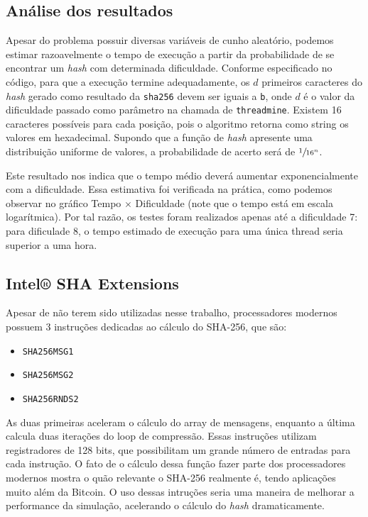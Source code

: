 \documentclass[12pt]{article}
\begin{document}
\subsection{Análise dos resultados}
Apesar do problema possuir diversas variáveis de cunho aleatório,
podemos estimar razoavelmente o tempo de execução
a partir da probabilidade de se encontrar um \textit{hash} com determinada dificuldade.
Conforme especificado no código,
para que a execução termine adequadamente,
os $d$ primeiros caracteres
do \textit{hash} gerado como resultado
da \texttt{sha256} devem ser iguais a \texttt{\textquotesingle{}b\textquotesingle{}},
onde $d$ é o valor da dificuldade
passado como parâmetro na chamada de \texttt{threadmine}.
Existem 16 caracteres possíveis para cada posição,
pois o algoritmo retorna como string os valores em hexadecimal.
Supondo que a função de \textit{hash}
apresente uma distribuição uniforme de valores,
a probabilidade de acerto será de $\sfrac{1}{16^{n}}$.

Este resultado nos indica que o tempo médio
deverá aumentar exponencialmente com a dificuldade.
Essa estimativa foi verificada na prática,
como podemos observar no gráfico Tempo $\times$ Dificuldade
(note que o tempo está em escala logarítmica).
Por tal razão, os testes foram realizados apenas até a dificuldade 7:
para dificulade 8, o tempo estimado de execução
para uma única thread seria superior a uma hora.

\subsection{Intel® SHA Extensions}
Apesar de não terem sido utilizadas nesse trabalho,
processadores modernos possuem 3 instruções
dedicadas ao cálculo do SHA-256, que são:
\begin{itemize}
	\item \texttt{SHA256MSG1}
	\item \texttt{SHA256MSG2}
	\item \texttt{SHA256RNDS2}
\end{itemize}

As duas primeiras aceleram o cálculo
do array de mensagens,
enquanto a última calcula
duas iterações do loop de compressão.
Essas instruções utilizam registradores de 128 bits,
que possibilitam um grande número de entradas para cada instrução.
O fato de o cálculo dessa função fazer parte dos processadores modernos
mostra o quão relevante o SHA-256 realmente é,
tendo aplicações muito além da Bitcoin.
O uso dessas intruções seria uma maneira de
melhorar a performance da simulação,
acelerando o cálculo do \textit{hash} dramaticamente.

\nocite{*}
\printbibliography
\end{document}
